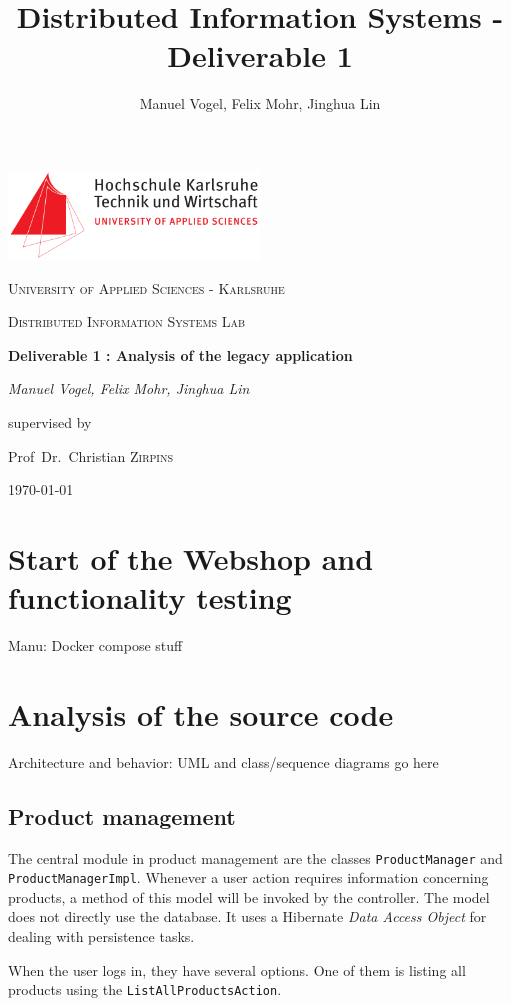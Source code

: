 \documentclass[11pt]{article}
\title{Distributed Information Systems - Deliverable 1}
\author{Manuel Vogel, Felix Mohr,  Jinghua Lin}
\begin{document}
	\begin{titlepage}
		\centering
		\includegraphics[width=0.5\textwidth]{hska-logo}\par\vspace{1cm}
		{\scshape\LARGE University of Applied Sciences - Karlsruhe \par}
		\vspace{1cm}
		{\scshape\Large Distributed Information Systems Lab\par}
		\vspace{1.5cm}
		{\huge\bfseries Deliverable 1 : Analysis of the legacy application\par}
		\vspace{2cm}
		{\Large\itshape Manuel Vogel, Felix Mohr,  Jinghua Lin\par}
		\vfill
		supervised by\par
		Prof~Dr.~Christian \textsc{Zirpins}
		\vfill
		{\large \today\par}
	\end{titlepage}
	
	\section{Start of the Webshop and functionality testing}
	Manu: Docker compose stuff
	
	\section{Analysis of the source code}
    Architecture and behavior: UML and class/sequence diagrams go here
    
    \subsection{Product management} %
	The central module in product management are the classes \texttt{ProductManager} and \texttt{ProductManagerImpl}. Whenever a user action requires information concerning products, a method of this model will be invoked by the controller. The model does not directly use the database. It uses a Hibernate \textit{Data Access Object} for dealing with persistence tasks.

    When the user logs in, they have several options. One of them is listing all products using the \texttt{ListAll\-ProductsAction}.
    
\end{document}
